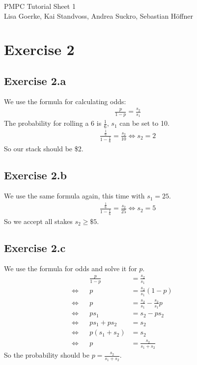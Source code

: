 \documentclass{article}
\begin{document}
\LARGE PMPC Tutorial Sheet 1\\
\small Lisa Goerke, Kai Standvoss, Andrea Suckro, Sebastian H\"offner
\vspace{0.5cm}
\normalsize


\section*{Exercise 2}
\subsection*{Exercise 2.a}

We use the formula for calculating odds:
\begin{align}
\frac{p}{1-p} = \frac{s_2}{s_1}
\end{align}
The probability for rolling a 6 is $\frac{1}{6}$, $s_1$ can be set to 10.
\begin{align}
\frac{\frac{1}{6}}{1-\frac{1}{6}} = \frac{s_2}{10} \Leftrightarrow s_2 = 2
\end{align}
So our stack should be \$2.


\subsection*{Exercise 2.b}
We use the same formula again, this time with $s_1=25$.
\begin{align}
\frac{\frac{1}{6}}{1-\frac{1}{6}} = \frac{s_2}{25} \Leftrightarrow s_2 = 5
\end{align}
So we accept all stakes $s_2 \geq \$ 5$.


\subsection*{Exercise 2.c}
We use the formula for odds and solve it for $p$.
\begin{align}
                & & \frac{p}{1 - p} & = \frac{s_2}{s_1}                     & & \\
\Leftrightarrow & & p               & = \frac{s_2}{s_1} (1 - p)             & & \\
\Leftrightarrow & & p               & = \frac{s_2}{s_1} - \frac{s_2}{s_1} p & & \\
\Leftrightarrow & & p s_1           & = s_2 - p s_2                         & & \\
\Leftrightarrow & & p s_1 + p s_2   & = s_2                                 & & \\
\Leftrightarrow & & p (s_1 + s_2)   & = s_2                                 & & \\
\Leftrightarrow & & p               & = \frac{s_2}{s_1 + s_2}               & &
\end{align}
So the probability should be $p = \frac{s_2}{s_1 + s_2}$.
\end{document}
